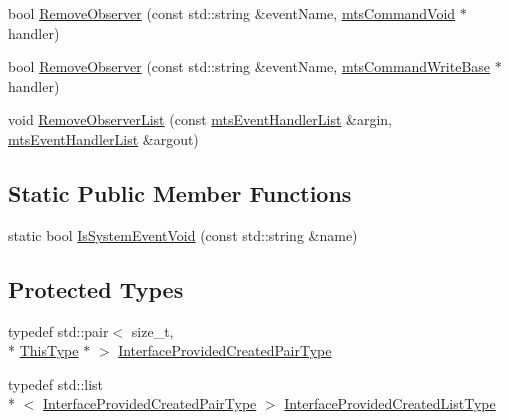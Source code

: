 {\bf }\par
\begin{DoxyCompactItemize}
\item 
bool \hyperlink{classmts_interface_provided_ae280bdf14394c7ba8cf103219bf61d9e}{Remove\-Observer} (const std\-::string \&event\-Name, \hyperlink{classmts_command_void}{mts\-Command\-Void} $\ast$handler)
\item 
bool \hyperlink{classmts_interface_provided_a4f4ebc9636cc26e18a3731ac435d5ad0}{Remove\-Observer} (const std\-::string \&event\-Name, \hyperlink{classmts_command_write_base}{mts\-Command\-Write\-Base} $\ast$handler)
\item 
void \hyperlink{classmts_interface_provided_a945e229f84321482a6c86ec71ed3029f}{Remove\-Observer\-List} (const \hyperlink{classmts_event_handler_list}{mts\-Event\-Handler\-List} \&argin, \hyperlink{classmts_event_handler_list}{mts\-Event\-Handler\-List} \&argout)
\end{DoxyCompactItemize}

\subsection*{Static Public Member Functions}
\begin{DoxyCompactItemize}
\item 
static bool \hyperlink{classmts_interface_provided_a78edc4dea8f5a89e52d36fe01843561b}{Is\-System\-Event\-Void} (const std\-::string \&name)
\end{DoxyCompactItemize}
\subsection*{Protected Types}
\begin{DoxyCompactItemize}
\item 
typedef std\-::pair$<$ size\-\_\-t, \\*
\hyperlink{classmts_interface_provided_a487e1de997186e03ed38d365592fd180}{This\-Type} $\ast$ $>$ \hyperlink{classmts_interface_provided_aa164de28d3de94ec992b6b93d5a8de5e}{Interface\-Provided\-Created\-Pair\-Type}
\item 
typedef std\-::list\\*
$<$ \hyperlink{classmts_interface_provided_aa164de28d3de94ec992b6b93d5a8de5e}{Interface\-Provided\-Created\-Pair\-Type} $>$ \hyperlink{classmts_interface_provided_ae16c05b551c38856866c199bc4551b98}{Interface\-Provided\-Created\-List\-Type}
\end{DoxyCompactItemize}
